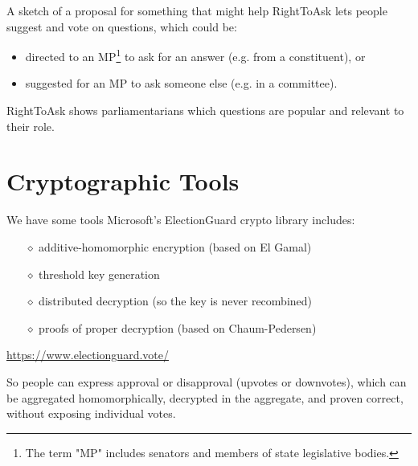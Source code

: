 \documentclass[10pt,xcolor=svgnames,169]{beamer} %
\begin{document}
	\begin{frame}[fragile]{A sketch of a proposal for something that might help}
	RightToAsk lets people
	 suggest and vote on questions, which could be:
	
	\begin{itemize}
		\item directed to an MP\footnote{The term "MP" includes senators and members of state legislative bodies.} to ask for an answer (e.g. from a constituent), or
		\item suggested for an MP to ask someone else (e.g. in a committee).		
	\end{itemize}

	
	RightToAsk shows parliamentarians which questions are popular and relevant to their role.
		
	\end{frame}
	
	\section{Cryptographic Tools}
	
	\begin{frame}[fragile]{We have some tools} %
		Microsoft's ElectionGuard crypto library includes: %
		\begin{itemize} %
			\item[$\diamond$] additive-homomorphic encryption (based on El Gamal)
			\item[$\diamond$] threshold key generation
			\item[$\diamond$] distributed decryption (so the key is never recombined)
			\item[$\diamond$] proofs of proper decryption (based on Chaum-Pedersen)
		\end{itemize}
	
		\url{https://www.electionguard.vote/}

	So people can express approval or disapproval (upvotes or downvotes), which can be aggregated homomorphically, decrypted in the aggregate, and proven correct, without exposing individual votes.
		
	\end{frame}
	
\end{document}
